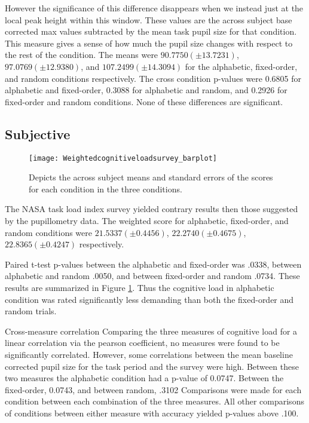 \documentclass[10pt]{article}
\begin{document}
However the significance of this difference disappears when we
instead just at the local peak height within this window.  These
values are the across subject base corrected max values subtracted
by the mean task pupil size for that condition.  This measure gives
a sense of how much the pupil size changes with respect to the rest
of the condition. The means were $90.7750 (\pm 13.7231)$, $97.0769 (\pm
12.9380)$, and $107.2499 (\pm 14.3094)$ for the alphabetic,
fixed-order, and random conditions respectively.  The cross
condition p-values were 0.6805 for alphabetic and fixed-order,
0.3088 for alphabetic and random, and 0.2926 for fixed-order and
random conditions.  None of these differences are significant.


\subsection{Subjective}

\begin{figure}[t]
  \centering
  \texttt{[image: Weightedcognitiveloadsurvey\_barplot]}
  \caption{Depicts the across subject means and standard errors of
  the scores for each condition in the three conditions.}
  \label{cogLoad}
\end{figure}

The NASA task load index survey yielded contrary results then
those suggested by the pupillometry data.  
The weighted score for alphabetic, fixed-order, and random
conditions were 
$21.5337 (\pm 0.4456)$, $22.2740 (\pm 0.4675)$, $22.8365 (\pm
0.4247)$ respectively.

Paired t-test p-values between the alphabetic and fixed-order was
.0338, between alphabetic and random .0050, and between fixed-order
and random .0734.  These results are summarized in Figure
\ref{cogLoad}.  Thus the cognitive load in alphabetic condition was
rated significantly less demanding than both the fixed-order and
random trials.

Cross-measure correlation
Comparing the three measures of cognitive load for a linear
correlation via the pearson coefficient, no measures were found to
be significantly correlated. However, some correlations between the
mean baseline corrected pupil size for the task period and the survey were high.
Between these two measures the alphabetic condition had a p-value
of 0.0747.  Between the fixed-order, 0.0743, and between random, .3102
Comparisons were made for each condition
between each combination of the three measures.  All other
comparisons of conditions between either measure with accuracy yielded
p-values above .100.
\end{document}
